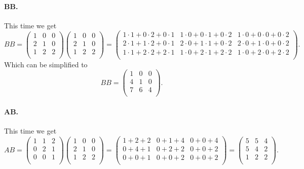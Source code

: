 \paragraph{BB.} This time we get
\[ 
B B = \begin{pmatrix}
1 & 0 & 0\\
2 & 1 & 0\\
1 & 2 & 2\\
\end{pmatrix} \begin{pmatrix}
1 & 0 & 0\\
2 & 1 & 0\\
1 & 2 & 2\\
\end{pmatrix} = \begin{pmatrix}
1 \cdot 1 + 0 \cdot 2 + 0 \cdot 1 & 1 \cdot 0 + 0 \cdot 1 + 0 \cdot 2 & 1 \cdot 0 + 0 \cdot 0 + 0 \cdot 2\\
2 \cdot 1 + 1 \cdot 2 + 0 \cdot 1 & 2 \cdot 0 + 1 \cdot 1 + 0 \cdot 2 & 2 \cdot 0 + 1 \cdot 0 + 0 \cdot 2\\
1 \cdot 1 + 2 \cdot 2 + 2 \cdot 1 & 1 \cdot 0 + 2 \cdot 1 + 2 \cdot 2 & 1 \cdot 0 + 2 \cdot 0 + 2 \cdot 2 \\
\end{pmatrix}
.\]
Which can be simplified to
\[ 
B B = \begin{pmatrix}
1 & 0 & 0\\
4 & 1 & 0\\
7 & 6 & 4\\
\end{pmatrix}
.\]


\paragraph{AB.} This time we get
\[ 
AB = \begin{pmatrix}
1 & 1 & 2\\
0 & 2 & 1\\
0 & 0 & 1\\
\end{pmatrix} \begin{pmatrix}
1 & 0 & 0\\
2 & 1 & 0\\
1 & 2 & 2\\
\end{pmatrix} = \begin{pmatrix}
1 + 2 + 2 & 0 + 1 + 4 & 0 + 0 + 4 \\
0 + 4 + 1 & 0 + 2 + 2 & 0 + 0 + 2 \\
0 + 0 + 1 & 0 + 0 + 2 & 0 + 0 + 2\\
\end{pmatrix} = \begin{pmatrix}
5 & 5 & 4\\
5 & 4 & 2\\
1 & 2 & 2\\
\end{pmatrix}
.\]


